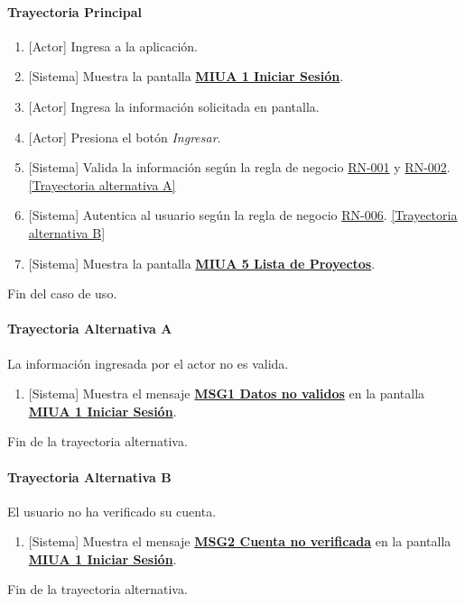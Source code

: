 \paragraph{Trayectoria Principal}
	\begin{enumerate}
	    \item {[Actor]} Ingresa a la aplicación.
	    \item {[Sistema]} Muestra la pantalla \hyperref[fig:MIUA-1]{\bf MIUA 1 Iniciar Sesión}.
	    \item {[Actor]} Ingresa la información solicitada en pantalla.
	    \item {[Actor]} Presiona el botón \textit{Ingresar}.
	    \item {[Sistema]} Valida la información según la regla de negocio \hyperref[RN001]{RN-001} y \hyperref[RN002]{RN-002}. \hyperref[A-USR-CU2:TA]{[Trayectoria alternativa A]}
	    \item {[Sistema]} Autentica al usuario según la regla de negocio \hyperref[RN006]{RN-006}. \hyperref[A-USR-CU2:TB]{[Trayectoria alternativa B]}
	    \item {[Sistema]} Muestra la pantalla \hyperref[fig:MIUA-5]{\bf MIUA 5 Lista de Proyectos}.
	\end{enumerate}
	Fin del caso de uso.

\paragraph{Trayectoria Alternativa A} \label{A-USR-CU2:TA}
	La información ingresada por el actor no es valida.
	\begin{enumerate}[label=A\arabic*.]
		\item {[Sistema]} Muestra el mensaje \hyperref[MSG1]{\bf MSG1 Datos no validos} en la pantalla \hyperref[fig:MIUA-1]{\bf MIUA 1 Iniciar Sesión}.
	\end{enumerate}
	Fin de la trayectoria alternativa.
\paragraph{Trayectoria Alternativa B} \label{A-USR-CU2:TB}
	El usuario no ha verificado su cuenta.
	\begin{enumerate}[label=B\arabic*.]
		\item {[Sistema]} Muestra el mensaje \hyperref[MSG2]{\bf MSG2 Cuenta no verificada} en la pantalla \hyperref[fig:MIUA-1]{\bf{MIUA 1 Iniciar Sesión}}.
	\end{enumerate}
	Fin de la trayectoria alternativa.